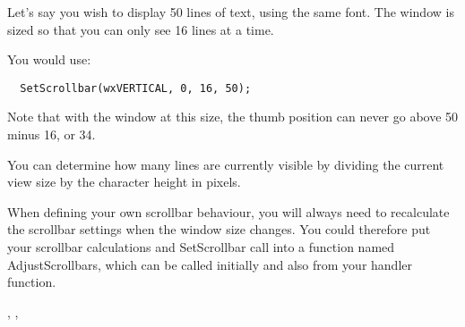 Let's say you wish to display 50 lines of text, using the same font.
The window is sized so that you can only see 16 lines at a time.

You would use:

{\small%
\begin{verbatim}
  SetScrollbar(wxVERTICAL, 0, 16, 50);
\end{verbatim}
}

Note that with the window at this size, the thumb position can never go
above 50 minus 16, or 34.

You can determine how many lines are currently visible by dividing the current view
size by the character height in pixels.

When defining your own scrollbar behaviour, you will always need to recalculate
the scrollbar settings when the window size changes. You could therefore put your
scrollbar calculations and SetScrollbar
call into a function named AdjustScrollbars, which can be called initially and also
from your  handler function.


,\rtfsp
{}, 

